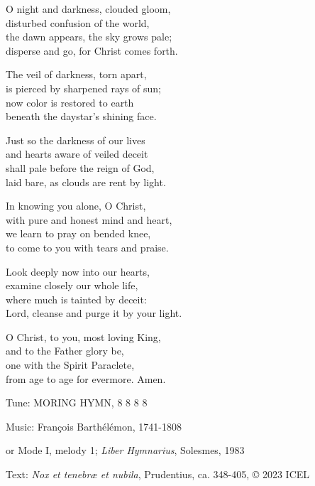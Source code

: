 \hymn

\begin{hymnverse}
O night and darkness, clouded gloom,\\
disturbed confusion of the world,\\
the dawn appears, the sky grows pale;\\
disperse and go, for Christ comes forth.

The veil of darkness, torn apart,\\
is pierced by sharpened rays of sun;\\
now color is restored to earth\\
beneath the daystar’s shining face.

Just so the darkness of our lives\\
and hearts aware of veiled deceit\\
shall pale before the reign of God,\\
laid bare, as clouds are rent by light.

In knowing you alone, O Christ,\\
with pure and honest mind and heart,\\
we learn to pray on bended knee,\\
to come to you with tears and praise.

Look deeply now into our hearts,\\
examine closely our whole life,\\
where much is tainted by deceit:\\
Lord, cleanse and purge it by your light.

O Christ, to you, most loving King,\\
and to the Father glory be,\\
one with the Spirit Paraclete,\\
from age to age for evermore. Amen.
\end{hymnverse}

\begin{hymnsource}
Tune: MORING HYMN, 8 8 8 8

Music: François Barthélémon, 1741-1808

or Mode I, melody 1; \emph{Liber Hymnarius}, Solesmes, 1983

Text: \emph{Nox et tenebræ et nubila}, Prudentius, ca. 348-405, © 2023 ICEL
\end{hymnsource}